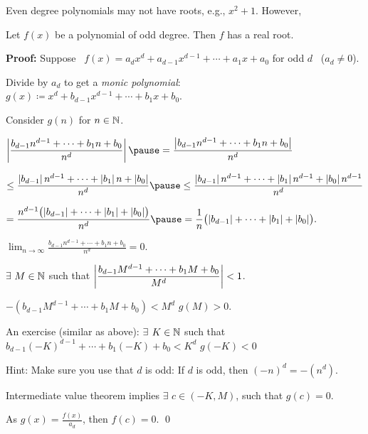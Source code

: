 \documentclass[10pt,aspectratio=169]{beamer}
\begin{document}
\begin{frame}
Even degree polynomials may not have roots, e.g., 
$x^2+1$.
\pause
However,

\begin{proposition}
Let $f(x)$ be a polynomial of odd degree.  Then $f$ has a real root.
\end{proposition}

\pause
\textbf{Proof:}
Suppose ~$f(x) = a_d x^d + a_{d-1} x^{d-1} + \cdots + a_1 x + a_0$ for odd
$d$ ~($a_d \not= 0$).

\pause
Divide by $a_d$ to get a \emph{monic polynomial}:
~ $g(x) \coloneqq x^d + b_{d-1} x^{d-1} + \cdots + b_1 x + b_0$.

\pause
\medskip

Consider $g(n)$ for $n \in {\mathbb{N}}$.

\pause
\medskip

$\displaystyle
\abs{\frac{b_{d-1} n^{d-1} + \cdots + b_1 n + b_0}{n^d}}
\pause
 =
\frac{\abs{b_{d-1} n^{d-1} + \cdots + b_1 n + b_0}}{n^d}
$

\pause
\medskip

\quad
$\displaystyle
\leq
\frac{\abs{b_{d-1}} n^{d-1} + \cdots + \abs{b_1} n + \abs{b_0}}{n^d}
\pause
\leq
\frac{\abs{b_{d-1}} n^{d-1} + \cdots + \abs{b_1} n^{d-1} + \abs{b_0} n^{d-1}}{n^d}
$

\pause
\medskip

\quad
$\displaystyle
=
\frac{n^{d-1}\bigl(\abs{b_{d-1}} + \cdots + \abs{b_1} + \abs{b_0}\bigr)}{n^d}
\pause
=
\frac{1}{n}
\bigl(\abs{b_{d-1}} + \cdots + \abs{b_1} + \abs{b_0}\bigr) .
$

\pause
\medskip

\thus \quad
$\displaystyle
\lim_{n\to\infty} \frac{b_{d-1} n^{d-1} + \cdots + b_1 n + b_0}{n^d}
= 0$.

\end{frame}

\begin{frame}

\thus \quad $\exists$ $M \in {\mathbb{N}}$ \quad such that 
\quad
$\displaystyle \left\lvert {\frac{b_{d-1} M^{d-1} + \cdots + b_1 M + b_0}{M^d}} \right\rvert < 1$.

\pause
\medskip

\thus \quad 
$\displaystyle
-(b_{d-1} M^{d-1} + \cdots + b_1 M + b_0) < M^d$
\pause
\wthus
$g(M) > 0$.

\pause
\medskip

An exercise (similar as above):
$\exists$ $K \in {\mathbb{N}}$ such that
$b_{d-1} {(-K)}^{d-1} + \cdots + b_1 (-K) + b_0 < K^d$
\wthus $g(-K) < 0$

\pause
\medskip

Hint: Make sure you use that $d$ is odd: If $d$ is odd, then ${(-n)}^d = -(n^d)$.

\pause
\medskip

Intermediate value theorem implies $\exists$
$c \in (-K,M)$, such that $g(c) = 0$.

\pause
\medskip

As $g(x) = \frac{f(x)}{a_d}$, then $f(c) = 0$.
\qed
\end{frame}
\end{document}

